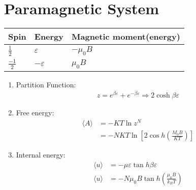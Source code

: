\section{Paramagnetic System}
\begin{tabular}{|p{2cm}|p{3cm}|p{4cm}|}
	\hline Spin&Energy&Magnetic moment\newline (energy)\\\hline
	$\frac{1}{2}$&$\varepsilon$&$-\mu_{0}B$\\\hline
	$\frac{-1}{2}$&$-\varepsilon$&$\mu_{0}B$\\\hline
\end{tabular}
\begin{enumerate}
	\item Partition Function: 
	\begin{align*}
	z=e^{\beta \varepsilon}+e^{-\beta \varepsilon} \Rightarrow 2 \cosh \beta \varepsilon
	\end{align*}
	\item Free energy: 
	\begin{align*}
	\langle A\rangle&=-K T \ln z^{N}\\
	&=-N K T \ln \left[2 \cos h\left(\frac{M_{0} B}{KT}\right)\right]
	\end{align*}
	\item Internal energy:
	\begin{align*}
	\langle u\rangle&=-\mu \varepsilon \tan h \beta \varepsilon\\
	\langle u\rangle&=-N \mu_{0} B \tan h\left(\frac{\mu_{0} B}{k_{B} T}\right)\\
	\end{align*}
	
\end{enumerate}


























